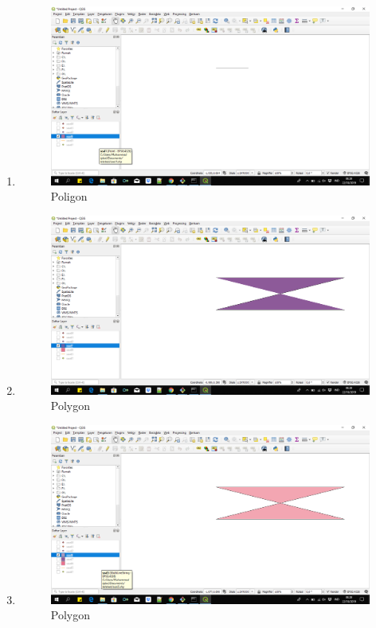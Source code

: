 \begin{enumerate}
	\item 
	
	\begin{figure}[H]
		\includegraphics[width=12cm]{figures/1174038/6.PNG}
		\centering
		\caption{Poligon}
	\end{figure}
	
	\item 
	
	\begin{figure}[H]
		\includegraphics[width=12cm]{figures/1174038/7.PNG}
		\centering
		\caption{Polygon}
	\end{figure}
	
	\item 
	
	\begin{figure}[H]
		\includegraphics[width=12cm]{figures/1174038/8.PNG}
		\centering
		\caption{Polygon}
	\end{figure}
	

\end{enumerate}
